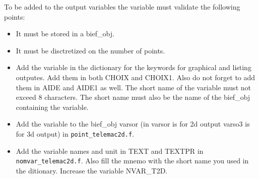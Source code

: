 To be added to the output variables the variable must validate the following
points:
\begin{itemize}
  \item It must be stored in a bief\_obj.
  \item It must be disctretized on the number of points.
\end{itemize}

\begin{itemize}
  \item Add the variable in the dictionary for the keywords for graphical and
    listing outputes. Add them in both CHOIX and CHOIX1. Also do not forget to
    add them in AIDE and AIDE1 as well. The short name of the variable must not
    exceed 8 characters. The short name must also be the name of the bief\_obj
    containing the variable.
  \item Add the variable to the bief\_obj varsor (in  varsor is for 2d output
    varso3 is for 3d output) in \verb!point_telemac2d.f!.
  \item Add the variable names and unit in TEXT and TEXTPR in
    \verb!nomvar_telemac2d.f!. Also fill the mnemo with the short name you used
    in the ditionary. Increase the variable NVAR\_T2D.
\end{itemize}
